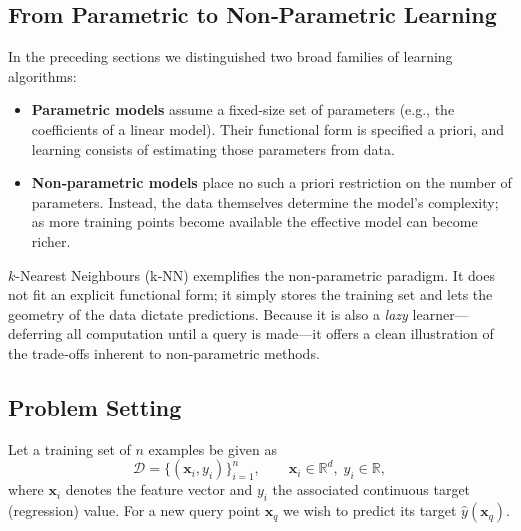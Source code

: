 \documentclass[12pt, a4paper]{article}
\begin{document}
\subsection{From Parametric to Non‑Parametric Learning}
In the preceding sections we distinguished two broad families of learning algorithms:
\begin{itemize}
  \item \textbf{Parametric models} assume a fixed‑size set of parameters (e.g., the coefficients of a linear model). Their functional form is specified a priori, and learning consists of estimating those parameters from data.
  \item \textbf{Non‑parametric models} place no such a priori restriction on the number of parameters. Instead, the data themselves determine the model’s complexity; as more training points become available the effective model can become richer.
\end{itemize}
\(k\)-Nearest Neighbours (k‑NN) exemplifies the non‑parametric paradigm.  It does not fit an explicit functional form; it simply stores the training set and lets the geometry of the data dictate predictions.  Because it is also a \emph{lazy} learner—deferring all computation until a query is made—it offers a clean illustration of the trade‑offs inherent to non‑parametric methods.

\subsection{Problem Setting}
Let a training set of \(n\) examples be given as
\[
\mathcal{D} = \{(\mathbf{x}_i , y_i)\}_{i=1}^{n},
\qquad 
\mathbf{x}_i \in \mathbb{R}^{d},\; y_i \in \mathbb{R},
\]
where \(\mathbf{x}_i\) denotes the feature vector and \(y_i\) the associated continuous target (regression) value.  
For a new query point \(\mathbf{x}_q\) we wish to predict its target \(\hat y(\mathbf{x}_q)\).
\end{document}
